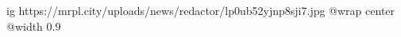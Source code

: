  
 
 
 
 

\ifcmt
  ig https://mrpl.city/uploads/news/redactor/lp0ub52yjnp8sji7.jpg
  @wrap center
  @width 0.9
\fi
